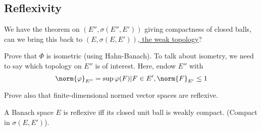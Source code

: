 \documentclass[twoside]{article}
\begin{document}
\subsection{Reflexivity}
\begin{aim}
    We have the  theorem on \hyperlink{def:weakstar}{$(E'', \sigma(E'', E'))$} giving compactness of closed balls, can we bring this back to \hyperlink{def:weak}{$(E, \sigma(E, E'))$, the weak topology}?
\end{aim}
\begin{ex}
    Prove that $\Phi$ is isometric (using Hahn-Banach).
    To talk about isometry, we need to say which topology on $E''$ is of interest.
    Here, endow $E''$ with
    \begin{equation*}
        \norm{\varphi}_{E''} = \sup{\varphi(F) | F \in E', \norm{F}_{E'} \leq 1}
    \end{equation*}

    Prove also that finite-dimensional normed vector spaces are reflexive.
\end{ex}
\begin{thm}[Kakutani]
    A Banach space $E$ is reflexive iff its closed unit ball is weakly compact. (Compact in $\sigma(E, E')$).
\end{thm}
\end{document}
